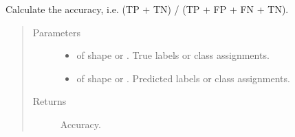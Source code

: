 \documentclass[letterpaper,10pt,english]{sphinxmanual}
\begin{document}
\begin{fulllineitems}
\label{\detokenize{pusion.evaluation.evaluation_metrics:pusion.evaluation.evaluation_metrics.accuracy}}
\sphinxAtStartPar
Calculate the accuracy, i.e. (TP + TN) / (TP + FP + FN + TN).
\begin{quote}\begin{description}
\item[{Parameters}] \leavevmode\begin{itemize}
\item {} 
\sphinxAtStartPar
{} \textendash{}  of shape  or . True labels or class assignments.

\item {} 
\sphinxAtStartPar
{} \textendash{}  of shape  or . Predicted labels or
class assignments.

\end{itemize}

\item[{Returns}] \leavevmode
\sphinxAtStartPar
Accuracy.

\end{description}\end{quote}

\end{fulllineitems}

\end{document}
